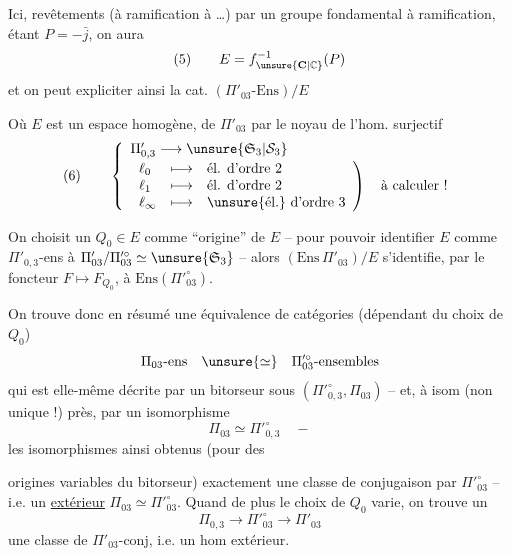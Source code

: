 
Ici,   revêtements  (à ramification  à \dots) par un groupe fondamental à ramification, étant  $P=-\bar j$, on aura
\[
(5)\qquad E=f_{\unsure{\mathbf C|\mathbb C}}^{-1}(P)
\]
et on peut expliciter ainsi la cat. $(\Pi'_{03}\text{-Ens})/E$\unsure{;}

Où $E$ est un espace homogène,   de $\Pi'_{03}$ par le   noyau de l'hom. surjectif 
\[
(6)\qquad
\left\{
\begin{array}{l}
\Pi'_{0,3}\longrightarrow\unsure{\mathfrak S_3|\mathcal S_3}\\[2pt]
\left.
\begin{array}{lll}
\ell_0 &\longmapsto& \text{él. d'ordre 2}\\
\ell_1 &\longmapsto& \text{él. d'ordre 2}\\
\ell_\infty &\longmapsto& \text{\unsure{él.} d'ordre 3}
\end{array}
\right)\quad\text{à calculer !}
\end{array}
\right.
\]

On choisit un $Q_0\in E$ comme ``origine'' de $E$ -- pour pouvoir identifier $E$ comme $\Pi'_{0,3}$-ens à $\Pi'_{03}/\Pi'^{\circ}_{03}\simeq\unsure{\mathfrak S_3}$ -- alors $(\mathrm{Ens}\,\Pi'_{03})/E$ s'identifie, par le foncteur $F\longmapsto F_{Q_0}$, à $\mathrm{Ens}(\Pi'^{\circ}_{03})$.

On trouve donc en résumé une équivalence de catégories (dépendant du choix de $Q_0$)
\[
\Pi_{03}\text{-ens}\quad\unsure{\simeq}\quad\Pi'^{\circ}_{03}\text{-ensembles}
\]
qui est elle-même décrite par un bitorseur sous $(\Pi'^{\circ}_{0,3},\Pi_{03})$ -- et, à isom  (non unique !) près, par un isomorphisme
\[
\Pi_{03}\simeq\Pi'^{\circ}_{0,3}\quad -
\]
les isomorphismes ainsi obtenus (pour des


origines variables du bitorseur)  exactement une classe de conjugaison par $\Pi'^{\circ}_{03}$ -- i.e. un \uline{} \uline{extérieur} $\Pi_{03}\simeq\Pi'^{\circ}_{03}$. Quand de plus le choix de $Q_0$ varie, on trouve  un 
\[
\Pi_{0,3}\longrightarrow\Pi'^{\circ}_{03}\longrightarrow\Pi'_{03}
\]
 une classe de $\Pi'_{03}$-conj, i.e. un hom extérieur.

